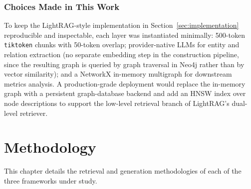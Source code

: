 \documentclass[12pt,a4paper,oneside]{report}
\begin{document}
\subsection{Choices Made in This Work}

To keep the LightRAG-style implementation in
Section~\ref{sec:implementation} reproducible and inspectable, each
layer was instantiated minimally: 500-token \texttt{tiktoken} chunks
with 50-token overlap; provider-native LLMs for entity and relation
extraction (no separate embedding step in the construction pipeline,
since the resulting graph is queried by graph traversal in Neo4j
rather than by vector similarity); and a NetworkX in-memory
multigraph for downstream metrics analysis. A production-grade
deployment would replace the in-memory graph with a persistent
graph-database backend and add an HNSW index over node descriptions
to support the low-level retrieval branch of LightRAG's dual-level
retriever.

\chapter{Methodology}
\label{ch:methodology}

This chapter details the retrieval and generation methodologies of each of
the three frameworks under study.
\end{document}
